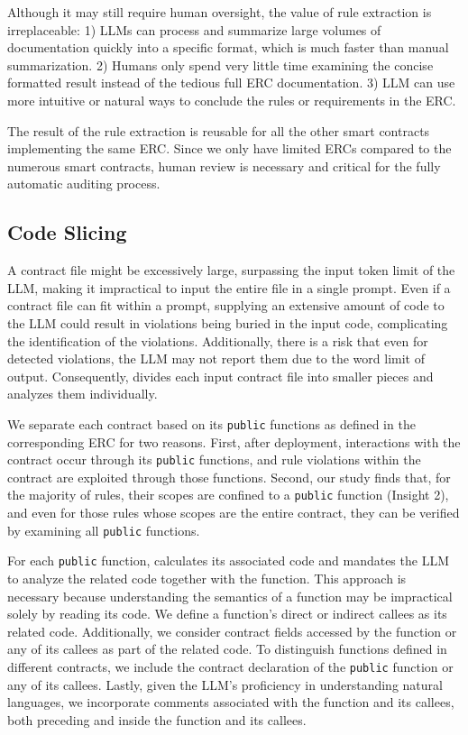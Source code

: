 {Although it may still require human oversight, the value of rule extraction is irreplaceable: 1) LLMs can process and summarize large volumes of documentation quickly into a specific format, which is much faster than manual summarization. 2)  Humans only spend very little time examining the concise formatted result instead of the tedious full ERC documentation. 3) LLM can use more intuitive or natural ways to conclude the rules or requirements in the ERC.

  The result of the rule extraction is reusable for all the other smart contracts implementing the same ERC. Since we only have limited ERCs compared to the numerous smart contracts, human review is necessary and critical for the fully automatic auditing process.

}

\fi

\subsection{Code Slicing}
A contract file might be excessively large, 
surpassing the input token limit of the LLM, 
making it impractical to input the entire file in a single prompt. 
Even if a contract file can fit within a prompt, supplying an extensive amount of code to 
the LLM could result in violations being buried in the input code, complicating the identification of the violations. Additionally, there is a risk that even for detected violations, the LLM may not report them due to the word limit of output. 
Consequently, 
\Tool{} divides each input contract file into smaller 
pieces and analyzes them individually.

We separate each contract 
based on its \texttt{public} functions as defined in the corresponding ERC 
for two reasons. First, after deployment, 
interactions with the contract occur through its \texttt{public} functions, and rule violations within 
the contract are exploited through those functions. 
Second, our study finds that, for the majority of rules, their scopes are confined to a \texttt{public} function (Insight 2), and even for those rules whose scopes are the 
entire contract, they can be verified 
by examining all \texttt{public} functions.

For each \texttt{public} function, \Tool{} calculates its associated code and 
mandates the LLM to analyze the related code together with the function. This approach is necessary because understanding the semantics of a function may be 
impractical solely by reading its code. We define a function's direct or 
indirect callees as its related code. Additionally, we consider contract 
fields accessed by the function or any of its callees as part of the related 
code. To distinguish functions defined in different contracts, we include the 
contract declaration of the \texttt{public} function or any of its callees. 
Lastly, given the LLM's proficiency in understanding natural languages, we 
incorporate comments associated with the function and its callees, both 
preceding and inside the function and its callees.

